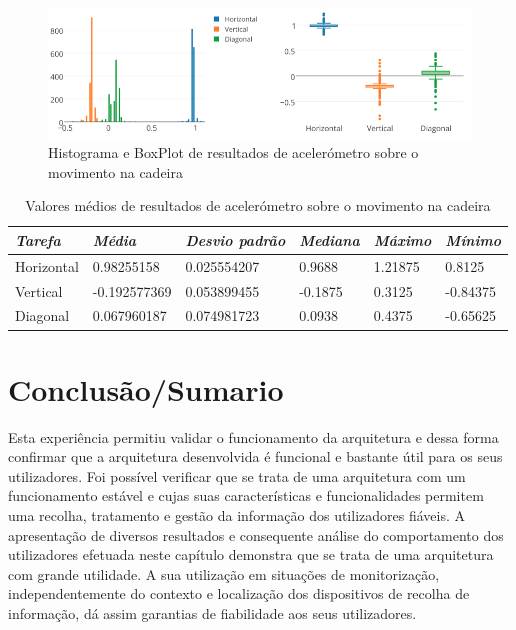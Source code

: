  \begin{figure}[htb]
   \centering
   \includegraphics[scale=0.45]{Images/acceleration.png}
   \caption{Histograma e BoxPlot de resultados de acelerómetro sobre o movimento na cadeira}
\end{figure}

{\renewcommand{\arraystretch}{1.6}
\begin{table}[!htb]
\centering
\label{tab:a_tbk}
\vspace{2pt}
\begin{tabular}{ | l | l | l | l | l | l |  }
\hline
\textit{Tarefa}&\textit{Média}&\textit{Desvio padrão}&\textit{Mediana} & \textit{Máximo} & \textit{Mínimo}\\  
\hline
Horizontal&0.98255158&0.025554207&0.9688&1.21875&0.8125 \\
Vertical&-0.192577369&0.053899455&-0.1875&0.3125&-0.84375 \\
Diagonal&0.067960187&0.074981723&0.0938&0.4375&-0.65625 \\
\hline
\end{tabular}
\caption{Valores médios de resultados de acelerómetro sobre o movimento na cadeira} 
\end{table}}



\section{Conclusão/Sumario}

Esta experiência permitiu validar o funcionamento da arquitetura e dessa forma confirmar que a arquitetura desenvolvida é funcional e bastante útil para os seus utilizadores. Foi possível verificar que se trata de uma arquitetura com um funcionamento estável e cujas suas características e funcionalidades permitem uma recolha, tratamento e gestão da informação dos utilizadores fiáveis. A apresentação de diversos resultados e consequente análise do comportamento dos utilizadores efetuada neste capítulo demonstra que se trata de uma arquitetura com grande utilidade. A sua utilização em situações de monitorização, independentemente do contexto e localização dos dispositivos de recolha de informação, dá assim garantias de fiabilidade aos seus utilizadores.

